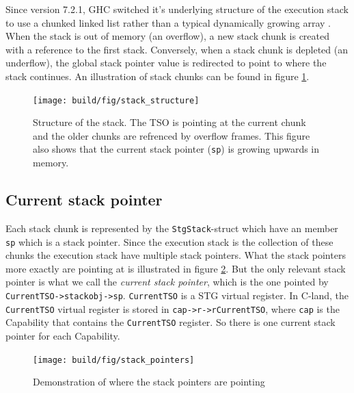 Since version 7.2.1, GHC switched it's underlying structure of the
execution stack to use a chunked linked list rather than a typical
dynamically growing array \cite{ghc_blog_overhaul_of_stack_management}
\cite{ghc_changeset_stack_chunks}. When the stack
is out of memory (an overflow), a new stack chunk is created with a reference
to the first stack. Conversely, when a stack chunk is depleted (an underflow),
the global stack pointer value is redirected to point to where the stack continues.
An illustration of stack chunks can be found in figure \ref{fig:stack_structure}.

\begin{figure}
\begin{mdframed}
  \texttt{[image: build/fig/stack\_structure]}
  \caption{Structure of the stack. The TSO is pointing at the current
  chunk and the older chunks are refrenced by overflow frames. This
  figure also shows that the current stack pointer (\texttt{sp}) is
  growing upwards in memory.}
  \label{fig:stack_structure}
\end{mdframed}
\end{figure}

\subsection{Current stack pointer}

Each stack chunk is represented by the \texttt{StgStack}-struct
which have an member \texttt{sp} which is a stack pointer.
Since the execution stack is the collection of these chunks the
execution stack have multiple stack pointers. What the stack
pointers more exactly are pointing at is illustrated in figure
\ref{fig:stack_pointers}. But the only relevant stack pointer is what
we call the \emph{current stack pointer}, which is the one pointed by
\texttt{CurrentTSO->stackobj->sp}. \texttt{CurrentTSO} is a STG virtual
register. In C-land, the \texttt{CurrentTSO} virtual register is stored
in \texttt{cap->r->rCurrentTSO}, where \texttt{cap} is the Capability
that contains the \texttt{CurrentTSO} register. So there is one current
stack pointer for each Capability.

\begin{figure}
\begin{mdframed}
  \texttt{[image: build/fig/stack\_pointers]}
  \caption{Demonstration of where the stack pointers are pointing}
  \label{fig:stack_pointers}
\end{mdframed}
\end{figure}

